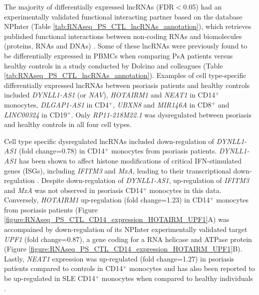 The majority of differentially expressed lncRNAs (FDR$<$0.05) had an experimentally validated functional interacting partner based on the database NPInter (Table \ref{tab:RNAseq_PS_CTL_lncRNAs_annotation}), which retrieves published functional interactions between non-coding RNAs and biomolecules (proteins, RNAs and DNAs) \parencite{Hao2016}. Some of these lncRNAs were previously found to be differentially expressed in PBMCs when comparing PsA patients versus healthy controls in a study conducted by Dolcino and colleagues \parencite{Dolcino2018} (Table \ref{tab:RNAseq_PS_CTL_lncRNAs_annotation}). Examples of cell type-specific differentially expressed lncRNAs between psoriasis patients and healthy controls included \textit{DYNLL1-AS1} (or \textit{NAV}), \textit{HOTAIRM1} and \textit{NEAT1} in CD14$^+$ monocytes, \textit{DLGAP1-AS1} in CD4$^+$, \textit{UBXN8} and \textit{MIR146A} in CD8$^+$ and \textit{LINC00324} in CD19$^+$. Only \textit{RP11-218M22.1} was dysregulated between psoriasis and healthy controls in all four cell types. 

Cell type specific dysregulated lncRNAs included down-regulation of \textit{DYNLL1-AS1} (fold change=0.78) in CD14$^+$ monocytes from psoriasis patients. \textit{DYNLL1-AS1} has been shown to affect histone modifications of critical IFN-stimulated genes (ISGs), including \textit{IFITM3} and \textit{MxA}, leading to their transcriptional down-regulation \parencite{Ouyang2014}. Despite down-regulation of \textit{DYNLL1-AS1}, up-regulation of \textit{IFITM3} and \textit{MxA} was not observed in psoriasis CD14$^+$ monocytes in this data.  Conversely, \textit{HOTAIRM1} up-regulation (fold change=1.23) in CD14$^+$ monocytes from psoriasis patients (Figure \ref{figure:RNAseq_PS_CTL_CD14_expression_HOTAIRM_UPF1}A) was accompained by down-regulation of its NPInter experimentally validated target \textit{UPF1} (fold change=0.87), a gene coding for a RNA helicase and ATPase protein \parencite{Hao2016} (Figure \ref{figure:RNAseq_PS_CTL_CD14_expression_HOTAIRM_UPF1}B). Lastly, \textit{NEAT1} expression was up-regulated (fold change=1.27) in psoriasis patients compared to controls in CD14$^+$ monocytes and has also been reported to be up-regulated in SLE CD14$^+$ monocytes when compared to healthy individuals \parencite{Zhang2016}.

